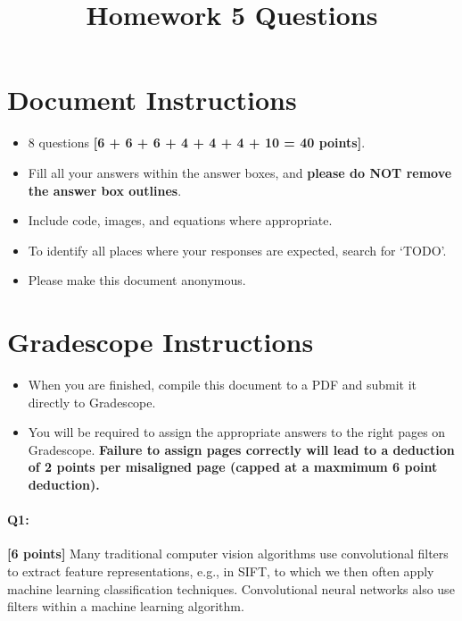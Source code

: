 \date{}
\title{\vspace{-1cm}Homework 5 Questions}



\maketitle
\vspace{-2cm}
\thispagestyle{fancy}


\section*{Document Instructions}
\begin{itemize}
  \item 8 questions \textbf{[6 + 6 + 6 + 4 + 4 + 4 + 10 = 40 points]}.
  \item Fill all your answers within the answer boxes, and \textbf{please do NOT remove the answer box outlines}.
  \item Include code, images, and equations where appropriate.
  \item To identify all places where your responses are expected, search for `TODO'.
  \item Please make this document anonymous.
\end{itemize}

\section*{ Gradescope Instructions}
\begin{itemize}
  \item When you are finished, compile this document to a PDF and submit it directly to Gradescope. 
  \item You will be required to assign the appropriate answers to the right pages on Gradescope. \textbf{Failure to assign pages correctly will lead to a deduction of 2 points per misaligned page (capped at a maxmimum 6 point deduction).}
\end{itemize}
\pagebreak




\pagebreak
\paragraph{Q1:} \textbf{[6 points]} Many traditional computer vision algorithms use convolutional filters to extract feature representations, e.g., in SIFT, to which we then often apply machine learning classification techniques. Convolutional neural networks also use filters within a machine learning algorithm.


